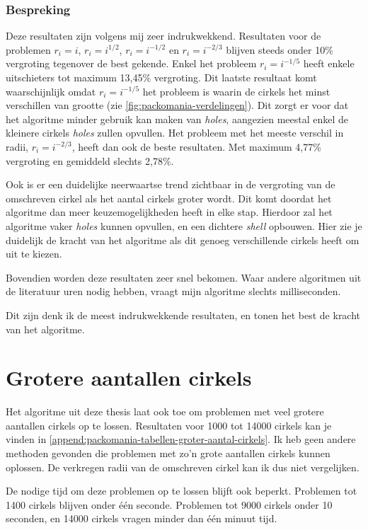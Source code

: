 \documentclass[12pt,a4paper,oneside]{book}
\begin{document}
{\subsubsection{Bespreking}

Deze resultaten zijn volgens mij zeer indrukwekkend.
Resultaten voor de problemen $r_i = i$, $r_i = i^{1/2}$, $r_i = i^{-1/2}$ en $r_i = i^{-2/3}$ blijven steeds onder 10\% vergroting tegenover de best gekende.
Enkel het probleem $r_i = i^{-1/5}$ heeft enkele uitschieters tot maximum 13,45\% vergroting.
Dit laatste resultaat komt waarschijnlijk omdat $r_i = i^{-1/5}$ het probleem is waarin de cirkels het minst verschillen van grootte (zie \autoref{fig:packomania-verdelingen}).
Dit zorgt er voor dat het algoritme minder gebruik kan maken van \textit{holes}, aangezien meestal enkel de kleinere cirkels \textit{holes} zullen opvullen.
Het probleem met het meeste verschil in radii, $r_i = i^{-2/3}$, heeft dan ook de beste resultaten.
Met maximum 4,77\% vergroting en gemiddeld slechts 2,78\%.

Ook is er een duidelijke neerwaartse trend zichtbaar in de vergroting van de omschreven cirkel als het aantal cirkels groter wordt.
Dit komt doordat het algoritme dan meer keuzemogelijkheden heeft in elke stap.
Hierdoor zal het algoritme vaker \textit{holes} kunnen opvullen, en een dichtere \textit{shell} opbouwen.
Hier zie je duidelijk de kracht van het algoritme als dit genoeg verschillende cirkels heeft om uit te kiezen.

Bovendien worden deze resultaten zeer snel bekomen.
Waar andere algoritmen uit de literatuur uren nodig hebben, vraagt mijn algoritme slechts milliseconden.

Dit zijn denk ik de meest indrukwekkende resultaten, en tonen het best de kracht van het algoritme.

\section{Grotere aantallen cirkels}

Het algoritme uit deze thesis laat ook toe om problemen met veel grotere aantallen cirkels op te lossen.
Resultaten voor 1000 tot 14000 cirkels kan je vinden in \autoref{append:packomania-tabellen-groter-aantal-cirkels}.
Ik heb geen andere methoden gevonden die problemen met zo'n grote aantallen cirkels kunnen oplossen.
De verkregen radii van de omschreven cirkel kan ik dus niet vergelijken.

De nodige tijd om deze problemen op te lossen blijft ook beperkt.
Problemen tot 1400 cirkels blijven onder één seconde.
Problemen tot 9000 cirkels onder 10 seconden, en 14000 cirkels vragen minder dan één minuut tijd.

}
\end{document}
